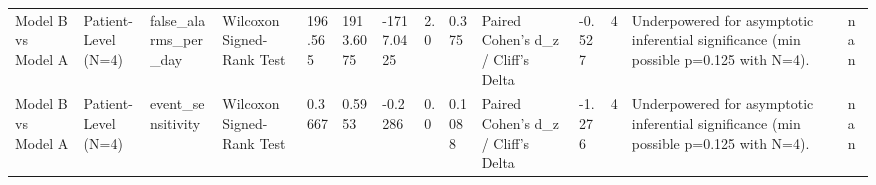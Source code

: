 \begin{table}[t]
\begin{tabular}{llllllllllllll}
Model B vs Model A & Patient-Level (N=4) & false\_alarms\_per\_day & Wilcoxon Signed-Rank Test & 196.565 & 1913.6075 & -1717.0425 & 2.0 & 0.375 & Paired Cohen's d\_z / Cliff's Delta & -0.527 & 4 & Underpowered for asymptotic inferential significance (min possible p=0.125 with N=4). & nan \\
Model B vs Model A & Patient-Level (N=4) & event\_sensitivity & Wilcoxon Signed-Rank Test & 0.3667 & 0.5953 & -0.2286 & 0.0 & 0.1088 & Paired Cohen's d\_z / Cliff's Delta & -1.276 & 4 & Underpowered for asymptotic inferential significance (min possible p=0.125 with N=4). & nan \\
\bottomrule
\end{tabular}
\end{table}
